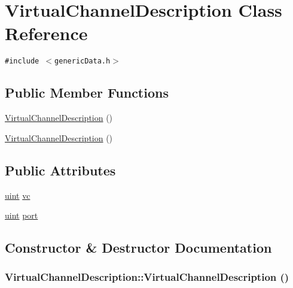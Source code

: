 \hypertarget{classVirtualChannelDescription}{
\section{VirtualChannelDescription Class Reference}
\label{classVirtualChannelDescription}
}
{\tt \#include $<$genericData.h$>$}

\subsection*{Public Member Functions}
\begin{CompactItemize}
\item 
\hyperlink{classVirtualChannelDescription_289d22640be56f23605294589d924607}{VirtualChannelDescription} ()
\item 
\hyperlink{classVirtualChannelDescription_289d22640be56f23605294589d924607}{VirtualChannelDescription} ()
\end{CompactItemize}
\subsection*{Public Attributes}
\begin{CompactItemize}
\item 
\hyperlink{outputBuffer_8h_91ad9478d81a7aaf2593e8d9c3d06a14}{uint} \hyperlink{classVirtualChannelDescription_efa589385b11e2b9450ed4132964bc71}{vc}
\item 
\hyperlink{outputBuffer_8h_91ad9478d81a7aaf2593e8d9c3d06a14}{uint} \hyperlink{classVirtualChannelDescription_f9d604a874c2a0239eb9a63dbf95308e}{port}
\end{CompactItemize}


\subsection{Constructor \& Destructor Documentation}
\hypertarget{classVirtualChannelDescription_289d22640be56f23605294589d924607}{
\subsubsection[{VirtualChannelDescription}]{\setlength{\rightskip}{0pt plus 5cm}VirtualChannelDescription::VirtualChannelDescription ()}}
\label{classVirtualChannelDescription_289d22640be56f23605294589d924607}


